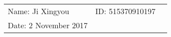 \documentclass{article}
\begin{document}
\begin{spacing}{1.5}
\vspace*{0.25cm}

\hrulefill

\thispagestyle{empty}

\begin{center}
\begin{large}
\end{large}

\hrulefill

\vspace*{5cm}
\begin{Large}
\end{Large}

\vspace{2em}

\end{center}


\vfill

\begin{table}[h!]
\flushleft
\begin{tabular}{lll}
Name: Ji Xingyou \hspace*{2em}&
ID: 515370910197\hspace*{2em}
\\

Date: 2 November 2017

\end{tabular}
\end{table}

\hfill

\newpage
\tableofcontents
\newpage

\end{spacing}
\end{document}
